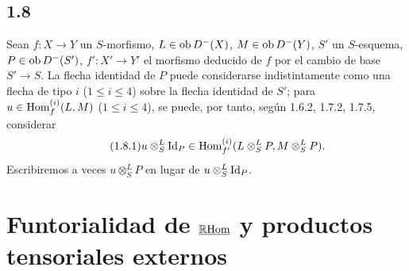 \subsection*{1.8}
Sean $f:X\to Y$ un $S$-morfismo, $L\in\operatorname{ob} D^{-}(X)$, $M\in\operatorname{ob} D^{-}(Y)$, $S'$ un $S$-esquema, $P\in\operatorname{ob} D^{-}(S')$, $f':X'\to Y'$ el morfismo deducido de $f$ por el cambio de base $S'\to S$. La flecha identidad de $P$ puede considerarse indistintamente como una flecha de tipo $i$ ($1\leq i\leq4$) sobre la flecha identidad de $S'$; para $u\in\operatorname{Hom}_f^{(i)}(L,M)$ ($1\leq i\leq4$), se puede, por tanto, según 1.6.2, 1.7.2, 1.7.5, considerar
\begin{equation}\tag{1.8.1}
u\otimes^{L}_{S}\mathrm{Id}_P\in\operatorname{Hom}_{f'}^{(i)}(L\otimes^{L}_{S}P,M\otimes^{L}_{S}P).
\end{equation}
Escribiremos a veces $u\otimes^{L}_{S}P$ en lugar de $u\otimes^{L}_{S}\mathrm{Id}_P$.

\section{Funtorialidad de \texorpdfstring{$\underline{\mathbb{R}\mathrm{Hom}}$}{RHom} y productos tensoriales externos}
